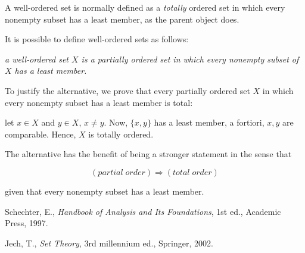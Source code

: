 \documentclass[12pt]{article}
\begin{document}
A well-ordered set is normally defined as a \emph{totally} ordered set in which every nonempty subset has a least member, as the parent object does.

It is possible to define well-ordered sets as follows:

\emph{a well-ordered set $X$ is a partially ordered set in which every nonempty subset of $X$ has a least member.}

To justify the alternative, we prove that every partially ordered set $X$ in which every nonempty subset has a least member is total:

let $x\in X$ and $y\in X$, $x\neq y$. Now, $\{x, y\}$ has a least member, a fortiori, $x, y$ are comparable. Hence, $X$ is totally ordered.

The alternative has the benefit of being a stronger statement in the sense that

\begin{equation*}
(partial\;order) \Longrightarrow (total\;order)
\end{equation*}

given that every nonempty subset has a least member.

\begin{thebibliography}{1}
Schechter, E., \emph{Handbook of Analysis and Its Foundations}, 1st ed., Academic Press, 1997.

Jech, T., \emph{Set Theory}, 3rd millennium ed., Springer, 2002.
\end{thebibliography}

\end{document}
